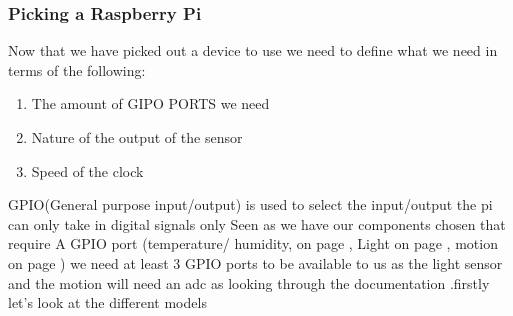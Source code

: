 \subsubsection{Picking a Raspberry Pi}
Now that we have  picked out a device to  use  we need to define what we need in terms of   the following:
\begin{enumerate}
	\item The amount of GIPO PORTS we need 
	\item Nature of the output of the sensor
	\item Speed of the clock
\end{enumerate}	
GPIO(General purpose input/output) is used  to select the input/output the pi can only take in  digital signals only
Seen as we have our components chosen that require A GPIO port (temperature/ humidity, on page \pageref{Compareing DHT22 and DHT11}, Light on page \pageref{table of light sensors}, motion on page \pageref{Motion sensor components})
we need at least  3 GPIO ports to be available to us as the light sensor and the motion will  need  an adc as looking through the documentation .firstly let's look at the  different models

